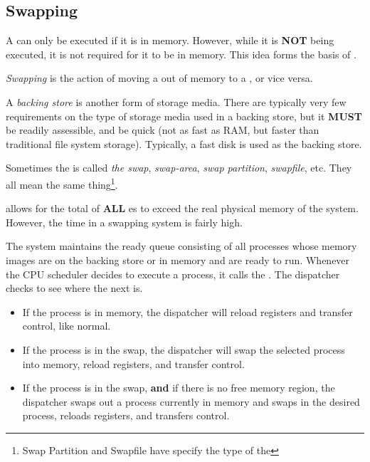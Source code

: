 \subsection{Swapping}\label{subsec:Swapping}
A  can only be executed if it is in memory.
However, while it is \textbf{NOT} being executed, it is not required for it to be in memory.
This idea forms the basis of .

\begin{definition}[Swapping]\label{def:Swapping}
  \emph{Swapping} is the action of moving a  out of memory to a , or vice versa.
\end{definition}

\begin{definition}\label{def:Backing_Store}
  A \emph{backing store} is another form of storage media.
  There are typically very few requirements on the type of storage media used in a backing store, but it \textbf{MUST} be readily assessible, and be quick (not as fast as RAM, but faster than traditional file system storage).
  Typically, a fast disk is used as the backing store.

  \begin{remark}[Swap]\label{rmk:Swap}
    Sometimes the  is called \emph{the swap}, \emph{swap-area}, \emph{swap partition}, \emph{swapfile}, etc.
    They all mean the same thing\footnote{Swap Partition and Swapfile have specify the type of the }.
  \end{remark}
\end{definition}

 allows for the total  of \textbf{ALL} es to exceed the real physical memory of the system.
However, the  time in a swapping system is fairly high.

The system maintains the ready queue consisting of all processes whose memory images are on the backing store or in memory and are ready to run.
Whenever the CPU scheduler decides to execute a process, it calls the .
The dispatcher checks to see where the next  is.
\begin{itemize}[noitemsep]
\item If the process is in memory, the dispatcher will reload registers and transfer control, like normal.
\item If the process is in the swap, the dispatcher will swap the selected process into memory, reload registers, and transfer control.
\item If the process is in the swap, \textbf{and} if there is no free memory region, the dispatcher swaps out a process currently in memory and swaps in the desired process, reloads registers, and transfers control.
\end{itemize}

